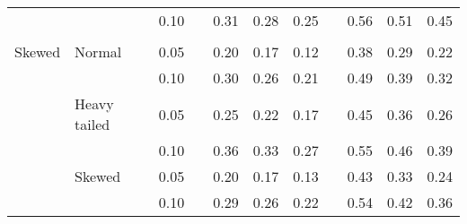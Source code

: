 \begin{table}[ht]
\begin{scriptsize}
\begin{center}
\begin{tabular}{ll p{.1cm} c p{.1cm} rrr p{.1cm} rrr}
             &              && 0.10 &&  0.31 & 0.28 & 0.25 && 0.56 & 0.51 & 0.45 \\ 
             &&&&&&&&&&&\\
Skewed       & Normal       && 0.05 &&  0.20 & 0.17 & 0.12 && 0.38 & 0.29 & 0.22 \\ 
             &              && 0.10 &&  0.30 & 0.26 & 0.21 && 0.49 & 0.39 & 0.32 \\ 
             & Heavy tailed && 0.05 &&  0.25 & 0.22 & 0.17 && 0.45 & 0.36 & 0.26 \\ 
             &              && 0.10 &&  0.36 & 0.33 & 0.27 && 0.55 & 0.46 & 0.39 \\ 
             & Skewed       && 0.05 &&  0.20 & 0.17 & 0.13 && 0.43 & 0.33 & 0.24 \\ 
             &              && 0.10 &&  0.29 & 0.26 & 0.22 && 0.54 & 0.42 & 0.36 \\
\hline
\end{tabular}
\end{center}
\end{scriptsize}
\end{table}

